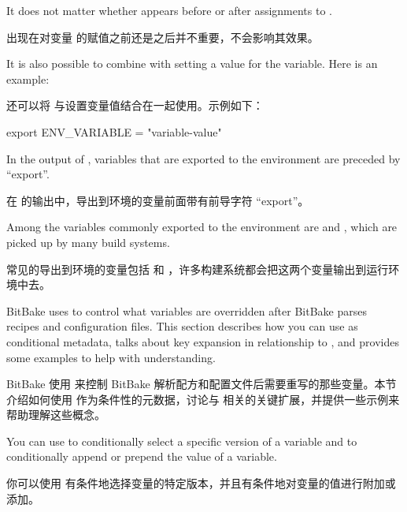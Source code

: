 

It does not matter whether  appears before or after assignments to .

 出现在对变量  的赋值之前还是之后并不重要，不会影响其效果。

It is also possible to combine  with setting a value for the variable. Here is an example:

还可以将  与设置变量值结合在一起使用。示例如下：

\begin{pyglist}
export ENV_VARIABLE = "variable-value"
\end{pyglist}

In the output of , variables that are exported to the environment are preceded by ``export''.

在   的输出中，导出到环境的变量前面带有前导字符 ``export''。

Among the variables commonly exported to the environment are  and , which are picked up by many build systems.

常见的导出到环境的变量包括  和 ，许多构建系统都会把这两个变量输出到运行环境中去。

\label{section:Conditional Syntax (Overrides)}

BitBake uses  to control what variables are overridden after BitBake parses recipes and configuration files. This section describes how you can use  as conditional metadata, talks about key expansion in relationship to , and provides some examples to help with understanding.

BitBake 使用  来控制 BitBake 解析配方和配置文件后需要重写的那些变量。本节介绍如何使用\linebreak {} 作为条件性的元数据，讨论与  相关的关键扩展，并提供一些示例来帮助理解这些概念。



You can use  to conditionally select a specific version of a variable and to conditionally append or prepend the value of a variable.

你可以使用  有条件地选择变量的特定版本，并且有条件地对变量的值进行附加或添加。

